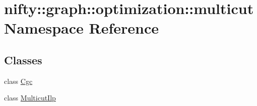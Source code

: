 \hypertarget{namespacenifty_1_1graph_1_1optimization_1_1multicut}{}\section{nifty\+:\+:graph\+:\+:optimization\+:\+:multicut Namespace Reference}
\label{namespacenifty_1_1graph_1_1optimization_1_1multicut}
\subsection*{Classes}
\begin{DoxyCompactItemize}
\item 
class \hyperlink{classnifty_1_1graph_1_1optimization_1_1multicut_1_1Cgc}{Cgc}
\item 
class \hyperlink{classnifty_1_1graph_1_1optimization_1_1multicut_1_1MulticutIlp}{Multicut\+Ilp}
\end{DoxyCompactItemize}
